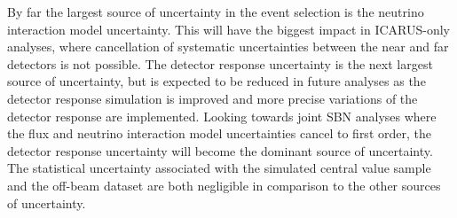 By far the largest source of uncertainty in the event selection is the neutrino interaction model uncertainty. This will have the biggest impact in ICARUS-only analyses, where cancellation of systematic uncertainties between the near and far detectors is not possible. The detector response uncertainty is the next largest source of uncertainty, but is expected to be reduced in future analyses as the detector response simulation is improved and more precise variations of the detector response are implemented. Looking towards joint SBN analyses where the flux and neutrino interaction model uncertainties cancel to first order, the detector response uncertainty will become the dominant source of uncertainty. The statistical uncertainty associated with the simulated central value sample and the off-beam dataset are both negligible in comparison to the other sources of uncertainty.